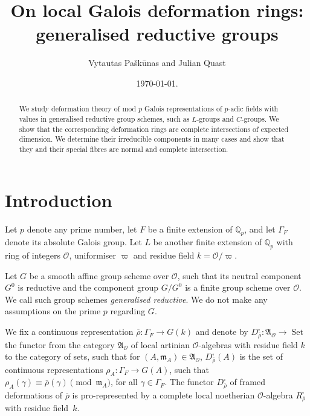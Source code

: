 \documentclass{amsart}
\title[On local Galois deformation rings]{On local Galois deformation rings:\\ generalised reductive groups}
\author{Vytautas Pa\v{s}k\={u}nas and  Julian Quast }
\date{\today.}
\makeatletter
\theoremstyle{definition}
\theoremstyle{remark}
\DeclareMathOperator{\Set}{Set}
\newcommand{\Qp}{\mathbb {Q}_p}
\newcommand{\mm}{\mathfrak m}
\newcommand{\OO}{\mathcal O}
\newcommand{\rhobar}{\overline{\rho}}
\renewcommand\tableofcontents{
  \@starttoc{toc}
}
\makeatother
\begin{document}
 

\begin{abstract} We study deformation theory of mod $p$ Galois representations 
of $p$-adic fields with values in generalised reductive group schemes, 
such as $L$-groups and $C$-groups. We show that the corresponding deformation
rings are complete intersections of expected dimension. We determine their 
irreducible components  in many cases and show that they and their special fibres are 
normal and complete intersection.  
\end{abstract}

\maketitle


\section*{\contentsname}
\tableofcontents
{}


\section{Introduction}


Let $p$ denote any prime number, let $F$ be a finite extension of $\Qp$, and let $\Gamma_F$ denote its absolute Galois group. Let $L$ be another finite extension of $\Qp$ with ring of integers $\OO$, uniformiser $\varpi$ and residue field $k=\OO/\varpi$.

Let $G$ be a smooth affine group scheme over $\OO$, such that its neutral 
component $G^0$ is reductive and the component group $G/G^0$ is a finite 
 group scheme over $\OO$. We call such group schemes \emph{generalised
reductive}. We do not make any assumptions on the prime $p$ regarding $G$. 

We fix a continuous representation $\rhobar:\Gamma_F\rightarrow G(k)$ and denote by $D^{\square}_{\rhobar}: \mathfrak A_{\OO}\rightarrow \Set$ the functor from the category $\mathfrak A_{\OO}$ of local artinian $\OO$-algebras with residue field $k$ to the category of sets, such that for $(A,\mm_A)\in \mathfrak A_{\OO}$, $D^{\square}_{\rhobar}(A)$ is the set of continuous representations 
$\rho_A: \Gamma_F\rightarrow G(A)$, such that 
$\rho_A(\gamma) \equiv \rhobar(\gamma) \pmod{\mm_A}$, for all $\gamma\in \Gamma_F.$
The 
functor $D^{\square}_{\rhobar}$ of framed deformations of $\rhobar$ is 
pro-represented by a complete local 
noetherian $\OO$-algebra $R^{\square}_{\rhobar}$ with residue field~$k$. 
\end{document}
